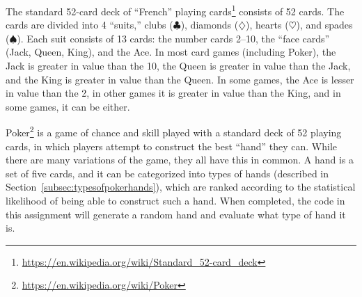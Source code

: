 The standard 52-card deck of ``French'' playing cards\footnote{\url{https://en.wikipedia.org/wiki/Standard_52-card_deck}} consists of 52 cards.
The cards are divided into 4 ``suits,'' clubs ($\clubsuit$), diamonds ($\diamondsuit$), hearts ($\heartsuit$), and spades ($\spadesuit$).
Each suit consists of 13 cards: the number cards 2--10, the ``face cards'' (Jack, Queen, King), and the Ace.
In most card games (including Poker), the Jack is greater in value than the 10, the Queen is greater in value than the Jack, and the King is greater in value than the Queen.
In some games, the Ace is lesser in value than the 2, in other games it is greater in value than the King, and in some games, it can be either.

Poker\footnote{\url{https://en.wikipedia.org/wiki/Poker}} is a game of chance and skill played with a standard deck of 52 playing cards, in which players attempt to construct the best ``hand'' they can.
While there are many variations of the game, they all have this in common.
A hand is a set of five cards, and it can be categorized into types of hands (described in Section~\ref{subsec:typesofpokerhands}), which are ranked according to the statistical likelihood of being able to construct such a hand.
When completed, the code in this assignment will generate a random hand and evaluate what type of hand it is.
